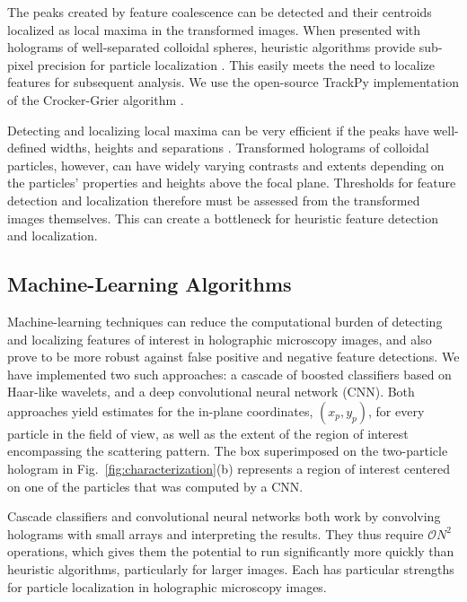 The peaks created by feature coalescence can be detected
and their centroids localized as local maxima in the transformed images.
When presented with holograms of well-separated
colloidal spheres, heuristic algorithms provide
sub-pixel precision for particle localization
\cite{cheong09,krishnatreya14a}.
This easily meets the need to localize
features for subsequent analysis.
We use the open-source
TrackPy implementation \cite{allan16trackpy}
of the Crocker-Grier algorithm \cite{crocker96}.

Detecting and localizing local maxima can be very
efficient if the peaks have well-defined widths,
heights and separations \cite{crocker96,allan16trackpy}.
Transformed holograms of colloidal particles, however,
can have widely varying contrasts
and extents depending on the particles' properties and
heights above the focal plane.
Thresholds for feature detection and localization therefore
must be assessed from the transformed images
themselves.
This can create a bottleneck
for
heuristic feature detection and localization.

\subsection{Machine-Learning Algorithms}

Machine-learning techniques can reduce the computational
burden of detecting and localizing features of interest in
holographic microscopy images, and also prove to be more
robust against false positive and negative feature detections.
We have implemented two such approaches:
a cascade of boosted classifiers based on Haar-like wavelets,
and a deep convolutional neural network (CNN).
Both approaches yield estimates for the in-plane
coordinates, $(x_p, y_p)$, for every particle in the field
of view, as well as the extent of the region of interest
encompassing the scattering pattern.
The box superimposed on the two-particle hologram in
Fig.~\ref{fig:characterization}(b) represents a
region of interest centered on one of the particles
that was computed by a CNN.

Cascade classifiers and convolutional neural networks
both work by convolving holograms with
small arrays and interpreting the results.
They thus require $\mathcal{O}{N^2}$ operations, which %
gives them the potential to run significantly more
quickly than heuristic algorithms, particularly for
larger images.
Each has particular strengths for particle localization
in holographic microscopy images.

